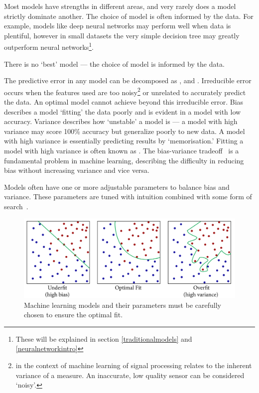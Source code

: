\documentclass[12pt, twoside]{book}
\renewcommand\emph[1]{\textit{\color{USred}{#1}}}
\begin{document}
Most models have strengths in different areas, and very rarely does a model strictly dominate another. The choice of model is often informed by the data. For example, models like deep neural networks may perform well when data is plentiful, however in small datasets the very simple decision tree may greatly outperform neural networks\footnote{These will be explained in section \ref{traditionalmodels} and \ref{neuralnetworkintro}}.



\begin{highlight}
There is no `best' model --- the choice of model is informed by the data.
\end{highlight}

The predictive error in any model can be decomposed as \emph{irreducible error}, \emph{bias} and \emph{variance}. Irreducible error occurs when the features used are too noisy\footnote{\emph{Noisy} in the context of machine learning of signal processing relates to the inherent variance of a measure. An inaccurate, low quality sensor can be considered `noisy'.} or unrelated to accurately predict the data. An optimal model cannot achieve beyond this irreducible error. Bias describes a model `fitting' the data poorly and is evident in a model with low accuracy. Variance describes how `unstable' a model is --- a model with high variance may score 100\% accuracy but generalize poorly to new data. A model with high variance is essentially predicting results by `memorisation.' Fitting a model with high variance is often known as \emph{overfitting}. The bias-variance tradeoff~\cite{biasvarnn} is a fundamental problem in machine learning, describing the difficulty in reducing bias without increasing variance and vice versa. 

Models often have one or more adjustable parameters to balance bias and variance. These parameters are tuned with intuition combined with some form of search~\cite{gridsearch, tpe}. 

\begin{figure}[h]
\label{overfitex}
\centering\includegraphics[width=1\linewidth]{overfit2.png}
\caption{Machine learning models and their parameters must be carefully chosen to ensure the optimal fit.}
\end{figure}
\end{document}

